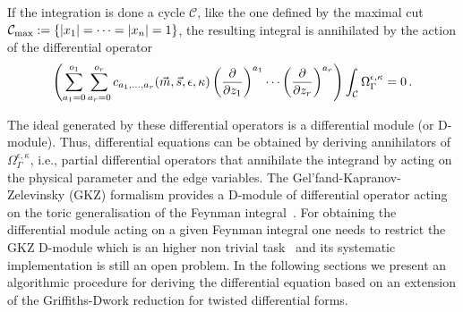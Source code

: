\documentclass[a4paper,12pt]{article}
\numberwithin{equation}{section}
\numberwithin{figure}{section}
\begin{document}
If the integration is done a cycle $\mathcal C$, like the one
defined  by the maximal cut $\mathcal C_{\rm
  max}:=\{|x_1|=\cdots=|x_n|=1\}$,  the resulting integral is
annihilated by the  action of the differential operator~\cite{Vanhove:2018mto}
\begin{equation}
	\left( \sum_{a_1=0}^{o_1} \sum_{ a_r=0}^{o_r} c_{a_1,\dots,a_r}(\vec m,\vec s,\epsilon,\kappa)\left(\partial\over \partial z_1\right)^{a_1}\cdots\left(\partial
	\over\partial z_r\right)^{a_r}  \right)\int_{\mathcal C }\Omega^{\epsilon,\kappa}_\Gamma=0\,.
\end{equation}
%


The ideal  generated by these
differential operators is a differential module (or D-module).  Thus,
differential equations can be obtained by deriving  annihilators  of
$\Omega_\Gamma^{\epsilon,\kappa}$, i.e., partial differential operators that
annihilate  the integrand by acting on the physical parameter and the
edge variables.   The Gel'fand-Kapranov-Zelevinsky (GKZ) formalism provides
a D-module of differential operator acting on the toric generalisation
of the Feynman
integral~\cite{Vanhove:2018mto,delaCruz:2019skx,Klausen:2019hrg,Feng:2019bdx,Klemm:2019dbm,Ananthanarayan:2022ntm,Agostini:2022cgv,
	Munch:2022ouq}.  For obtaining the differential module acting on a
given Feynman integral one needs to restrict the GKZ  D-module which
is an higher non trivial task~\cite{delaCruz:2019skx,Chestnov:2023kww} and its systematic implementation is
still an open problem. In the following sections we present an
algorithmic procedure for deriving the differential equation based on
an extension of the Griffiths-Dwork reduction for twisted differential forms.



\end{document}
